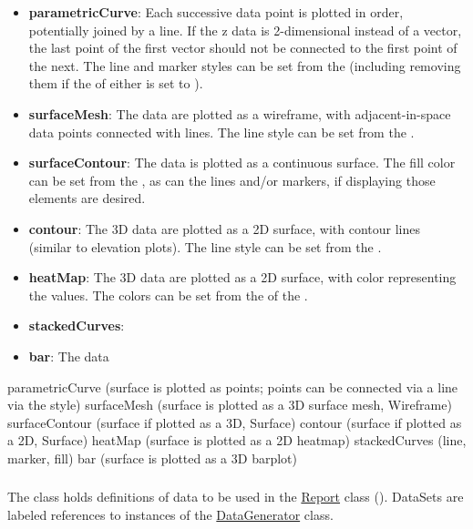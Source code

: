 \begin{blockChanged}
\begin{itemize}
\item \textbf{parametricCurve}: Each successive data point is plotted in order, potentially joined by a line.  If the z data is 2-dimensional instead of a vector, the last point of the first vector should not be connected to the first point of the next.  The line and marker styles can be set from the  (including removing them if the  of either is set to ).
\item \textbf{surfaceMesh}: The data are plotted as a wireframe, with adjacent-in-space data points connected with lines.  The line style can be set from the .
\item \textbf{surfaceContour}: The data is plotted as a continuous surface.  The fill color can be set from the , as can the lines and/or markers, if displaying those elements are desired.
\item \textbf{contour}:  The 3D data are plotted as a 2D surface, with contour lines (similar to elevation plots).  The line style can be set from the .
\item \textbf{heatMap}:  The 3D data are plotted as a 2D surface, with color representing the values.  The colors can be set from the  of the .
\item \textbf{stackedCurves}:  
\item \textbf{bar}: The data 
\end{itemize}
parametricCurve (surface is plotted as points; points can be connected via a line via the style)
surfaceMesh (surface is plotted as a 3D surface mesh, Wireframe)
surfaceContour (surface if plotted as a 3D, Surface)
contour (surface if plotted as a 2D, Surface)
heatMap (surface is plotted as a 2D heatmap)
stackedCurves (line, marker, fill)
bar (surface is plotted as a 3D barplot)


\end{blockChanged}



\subsubsection{}
\label{class:dataSet}
The  class holds definitions of data to be used in the \hyperref[class:report]{Report} class (). DataSets are labeled references to instances of the \hyperref[class:dataGenerator]{DataGenerator} class.

